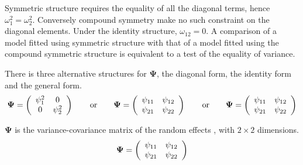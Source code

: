 \documentclass[12pt, a4paper]{report}
\theoremstyle{plain}
\theoremstyle{definition}
\theoremstyle{remark}
\begin{document}
	Symmetric structure requires the equality of all the diagonal terms, hence $\omega^2_1 = \omega^2_2$. Conversely compound symmetry make no such constraint on the diagonal elements. Under the identity structure, $\omega_{12} = 0$.
	A comparison of a model fitted using symmetric structure with that of a model fitted using the compound symmetric structure is equivalent to a test of the equality of variance.
	
	
	
	\newpage
	
	
	
	
	
	
	
	There is three alternative structures for
	$\boldsymbol{\Psi}$, the diagonal form, the identity form and the general form.
	\[
	\boldsymbol{\Psi} =
	\left(%
	\begin{array}{c c}
	\psi^2_1 & 0  \\
	0 & \psi^2_2  \\
	\end{array}%
	\right)\qquad \mathrm{or} \qquad \boldsymbol{\Psi} =
	\left(%
	\begin{array}{c c}
	\psi_{11} & \psi_{12}  \\
	\psi_{21} & \psi_{22}  \\
	\end{array}%
	\right)
	\qquad \mathrm{or} \qquad \boldsymbol{\Psi} =
	\left(%
	\begin{array}{c c}
	\psi_{11} & \psi_{12}  \\
	\psi_{21} & \psi_{22}  \\
	\end{array}%
	\right)
	\]
	
	$\boldsymbol{\Psi}$ is the variance-covariance matrix of the random effects ,
	with $2 \times 2$ dimensions.
	\begin{equation}
	\boldsymbol{\Psi} =
	\left(%
	\begin{array}{c c}
	\psi_{11} & \psi_{12}  \\
	\psi_{21} & \psi_{22}  \\
	\end{array}%
	\right)
	\end{equation}
\end{document}
